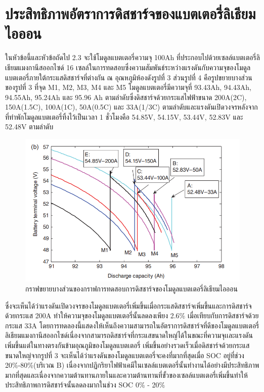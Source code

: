 \section{ประสิทธิภาพอัตราการดิสชาร์จของแบตเตอรี่ลิเธียมไอออน}
ในหัวข้อนี้และหัวข้อถัดไป 2.3 จะใช้โมดูลแบตเตอรี่ความจุ 100Ah ที่ประกอบไปด้วยเซลล์แบตเตอรี่ลิเธียมแมงกานีสออกไซด์ 16 เซลล์ในการทดสอบซึ่งความสัมพันธ์ระหว่างแรงดันกับความจุของโมดูลแบตเตอรี่ภายใต้กระแสดิสชาร์จที่ต่างกัน ณ อุณหภูมิห้องดังรูปที่ 3 ส่วนรูปที่ 4 คือรูปขยายบางส่วนของรูปที่ 3 ที่จุด M1, M2, M3, M4 และ M5 โมดูลแบตเตอรี่มีความจุที่ 93.43Ah, 94.43Ah, 94.55Ah, 95.24Ah และ 95.96 Ah ตามลำดับซึ่งดิสชาร์จด้วยกระแสไฟฟ้าขนาด 200A(2C), 150A(1.5C), 100A(1C), 50A(0.5C) และ 33A(1/3C) ตามลำดับและแรงดันเปิดวงจรหลังจากที่ทำพักโมดูลแบตเตอรี่ทิ้งไว้เป็นเวลา 1 ชั่วโมงคือ 54.85V, 54.15V, 53.44V, 52.83V และ 52.48V ตามลำดับ\newline
\begin{center}
	\begin{figure}[!h]
		\includegraphics[width=0.6\linewidth]{Chapters/img/IV_b.png}
			\centering
			\captionsetup{justification=centering,margin=2cm}
			\caption{กราฟขยายบางส่วนของกราฟการทดสอบการดิสชาร์จของโมดูลแบตเตอรี่ลิเธียมไอออน}
	\end{figure}
\end{center}
ซึ่งจะเห็นได้ว่าแรงดันเปิดวงจรของโมดูลแบตเตอรี่เพิ่มขึ้นเมื่อกระแสดิสชาร์จเพิ่มขึ้นและการดิสชาร์จด้วยกระแส 200A ทำให้ความจุของโมดูลแบตเตอรี่นั้นลดลงเพียง 2.6\% เมื่อเทียบกับการดิสชาร์จด้วยกระแส 33A โดยการทดลองนี้แสดงให้เห็นถึงความสามารถในอัตราการดิสชาร์จที่ดีของโมดูลแบตเตอรี่ลิเธียมแมงกานีสออกไซด์เนื่องจากสามารถดิสชาร์จที่กระแสขนาดใหญ่ได้ในขณะที่ความจุเเละแรงดันเพิ่มขึ้นแต่ในทางตรงกันข้ามอุณภูมิของโมดูลแบตเตอรี่
เพิ่มขึ้นอย่างรวดเร็วเมื่อดิสชาร์จด้วยกระแสขนาดใหญ่จากรูปที่ 3 จะเห็นได้ว่าแรงดันของโมดูลแบตเตอรี่จะคงที่มากที่สุดเมื่อ SOC อยู่ที่ช่วง 20\%-80\%(บริเวณ B) เนื่องจากปฏิกริยาไฟฟ้าเคมีในเซลล์แบตเตอรี่นั้นทำงานได้อย่างมีประสิทธิภาพมากที่สุดและเนื่องจากความต้านทานภายในและความต้านทานที่ขั้วของเซลล์แบตเตอรี่เพิ่มขึ้นทำให้ประสิทธิภาพการดิสชาร์จนั้นลดลงมากในช่วง SOC 0\% - 20\%
